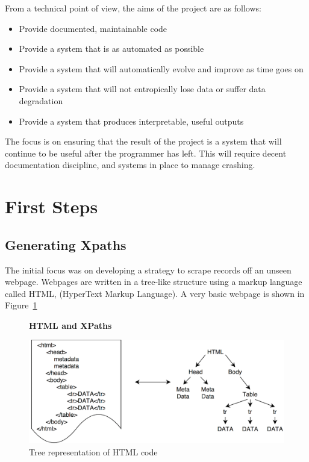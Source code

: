 \documentclass[11pt, oneside]{article}   	%
\begin{document}
From a technical point of view, the aims of the project are as follows:
\begin{itemize}
\item{Provide documented, maintainable code}
\item{Provide a system that is as automated as possible}
\item{Provide a system that will automatically evolve and improve as time goes on}
\item{Provide a system that will not entropically lose data or suffer data degradation}
\item{Provide a system that produces interpretable, useful outputs}
\end{itemize}
The focus is on ensuring that the result of the project is a system that will continue to be useful after the programmer has left. This will require decent documentation discipline, and systems in place to manage crashing.
\section{First Steps}
\subsection{Generating Xpaths}
The initial focus was on developing a strategy to scrape records off an unseen webpage.
Webpages are written in a tree-like structure using a markup language called HTML, (HyperText Markup Language). A very basic webpage is shown in Figure~\ref{fig:HTMLTREE}
\begin{figure}
    \centering
    \textbf{HTML and XPaths}\par\medskip
    \includegraphics[scale=0.3]{HTMLTREE2.png}
    \caption{Tree representation of HTML code\label{fig:HTMLTREE}}
\end{figure}
\end{document}

